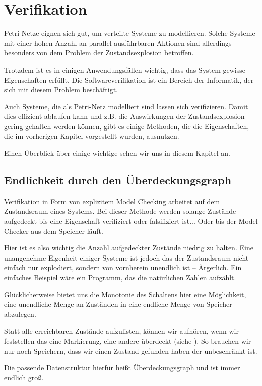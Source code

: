 \chapter{Verifikation}
Petri Netze eignen sich gut, um verteilte Systeme zu modellieren.
Solche Systeme mit einer hohen Anzahl an parallel ausführbaren Aktionen sind allerdings besonders von dem Problem der Zustandsexplosion betroffen.

Trotzdem ist es in einigen Anwendungsfällen wichtig, dass das System gewisse Eigenschaften erfüllt.
Die Softwareverifikation ist ein Bereich der Informatik, der sich mit diesem Problem beschäftigt.

Auch Systeme, die als Petri-Netz modelliert sind lassen sich verifizieren.
Damit dies effizient ablaufen kann und z.B. die Auswirkungen der Zustandsexplosion gering gehalten werden können, gibt es einige Methoden, die die Eigenschaften, die im vorherigen Kapitel vorgestellt wurden, ausnutzen.

Einen Überblick über einige wichtige sehen wir uns in diesem Kapitel an.

\section{Endlichkeit durch den Überdeckungsgraph}
Verifikation in Form von explizitem Model Checking arbeitet auf dem Zustandsraum eines Systems.
Bei dieser Methode werden solange Zustände aufgedeckt bis eine Eigenschaft verifiziert oder falsifiziert ist... Oder bis der Model Checker aus dem Speicher läuft.

Hier ist es also wichtig die Anzahl aufgedeckter Zustände niedrig zu halten.
Eine unangenehme Eigenheit einiger Systeme ist jedoch das der Zustandsraum nicht einfach nur explodiert, sondern von vornherein unendlich ist -- Ärgerlich.
Ein einfaches Beispiel wäre ein Programm, das die natürlichen Zahlen aufzählt.

Glücklicherweise bietet uns die Monotonie des Schaltens hier eine Möglichkeit, eine unendliche Menge an Zuständen in eine endliche Menge von Speicher abzulegen.

Statt alle erreichbaren Zustände aufzulisten, können wir aufhören, wenn wir feststellen das eine Markierung, eine andere überdeckt (siehe \cite{?2.2}).
So brauchen wir nur noch Speichern, dass wir einen Zustand gefunden haben der unbeschränkt ist.

Die passende Datenstruktur hierfür heißt Überdeckungsgraph und ist immer endlich groß.

